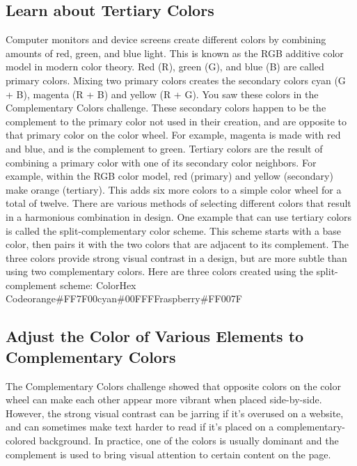 \documentclass{article}%
\begin{document}
\subsection{Learn about Tertiary Colors}%
\label{subsec:LearnaboutTertiaryColors}%
Computer monitors and device screens create different colors by combining amounts of red, green, and blue light. This is known as the RGB additive color model in modern color theory. Red (R), green (G), and blue (B) are called primary colors. Mixing two primary colors creates the secondary colors cyan (G + B), magenta (R + B) and yellow (R + G). You saw these colors in the Complementary Colors challenge. These secondary colors happen to be the complement to the primary color not used in their creation, and are opposite to that primary color on the color wheel. For example, magenta is made with red and blue, and is the complement to green.\newline%
Tertiary colors are the result of combining a primary color with one of its secondary color neighbors. For example, within the RGB color model, red (primary) and yellow (secondary) make orange (tertiary). This adds six more colors to a simple color wheel for a total of twelve.\newline%
There are various methods of selecting different colors that result in a harmonious combination in design. One example that can use tertiary colors is called the split{-}complementary color scheme. This scheme starts with a base color, then pairs it with the two colors that are adjacent to its complement. The three colors provide strong visual contrast in a design, but are more subtle than using two complementary colors.\newline%
Here are three colors created using the split{-}complement scheme:\newline%
ColorHex Codeorange\#FF7F00cyan\#00FFFFraspberry\#FF007F\newline%

%
\subsection{Adjust the Color of Various Elements to Complementary Colors}%
\label{subsec:AdjusttheColorofVariousElementstoComplementaryColors}%
The Complementary Colors challenge showed that opposite colors on the color wheel can make each other appear more vibrant when placed side{-}by{-}side. However, the strong visual contrast can be jarring if it's overused on a website, and can sometimes make text harder to read if it's placed on a complementary{-}colored background. In practice, one of the colors is usually dominant and the complement is used to bring visual attention to certain content on the page.\newline%
\end{document}
